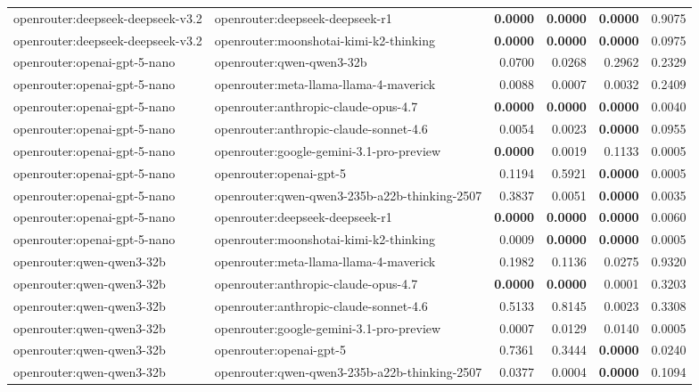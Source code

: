 \begin{table}[t]
\begin{tabular}{llrrrr}
openrouter:deepseek-deepseek-v3.2 & openrouter:deepseek-deepseek-r1 & \textbf{0.0000} & \textbf{0.0000} & \textbf{0.0000} & 0.9075 \\
openrouter:deepseek-deepseek-v3.2 & openrouter:moonshotai-kimi-k2-thinking & \textbf{0.0000} & \textbf{0.0000} & \textbf{0.0000} & 0.0975 \\
openrouter:openai-gpt-5-nano & openrouter:qwen-qwen3-32b & 0.0700 & 0.0268 & 0.2962 & 0.2329 \\
openrouter:openai-gpt-5-nano & openrouter:meta-llama-llama-4-maverick & 0.0088 & 0.0007 & 0.0032 & 0.2409 \\
openrouter:openai-gpt-5-nano & openrouter:anthropic-claude-opus-4.7 & \textbf{0.0000} & \textbf{0.0000} & \textbf{0.0000} & 0.0040 \\
openrouter:openai-gpt-5-nano & openrouter:anthropic-claude-sonnet-4.6 & 0.0054 & 0.0023 & \textbf{0.0000} & 0.0955 \\
openrouter:openai-gpt-5-nano & openrouter:google-gemini-3.1-pro-preview & \textbf{0.0000} & 0.0019 & 0.1133 & 0.0005 \\
openrouter:openai-gpt-5-nano & openrouter:openai-gpt-5 & 0.1194 & 0.5921 & \textbf{0.0000} & 0.0005 \\
openrouter:openai-gpt-5-nano & openrouter:qwen-qwen3-235b-a22b-thinking-2507 & 0.3837 & 0.0051 & \textbf{0.0000} & 0.0035 \\
openrouter:openai-gpt-5-nano & openrouter:deepseek-deepseek-r1 & \textbf{0.0000} & \textbf{0.0000} & \textbf{0.0000} & 0.0060 \\
openrouter:openai-gpt-5-nano & openrouter:moonshotai-kimi-k2-thinking & 0.0009 & \textbf{0.0000} & \textbf{0.0000} & 0.0005 \\
openrouter:qwen-qwen3-32b & openrouter:meta-llama-llama-4-maverick & 0.1982 & 0.1136 & 0.0275 & 0.9320 \\
openrouter:qwen-qwen3-32b & openrouter:anthropic-claude-opus-4.7 & \textbf{0.0000} & \textbf{0.0000} & 0.0001 & 0.3203 \\
openrouter:qwen-qwen3-32b & openrouter:anthropic-claude-sonnet-4.6 & 0.5133 & 0.8145 & 0.0023 & 0.3308 \\
openrouter:qwen-qwen3-32b & openrouter:google-gemini-3.1-pro-preview & 0.0007 & 0.0129 & 0.0140 & 0.0005 \\
openrouter:qwen-qwen3-32b & openrouter:openai-gpt-5 & 0.7361 & 0.3444 & \textbf{0.0000} & 0.0240 \\
openrouter:qwen-qwen3-32b & openrouter:qwen-qwen3-235b-a22b-thinking-2507 & 0.0377 & 0.0004 & \textbf{0.0000} & 0.1094 \\

\end{tabular}
\end{table}
